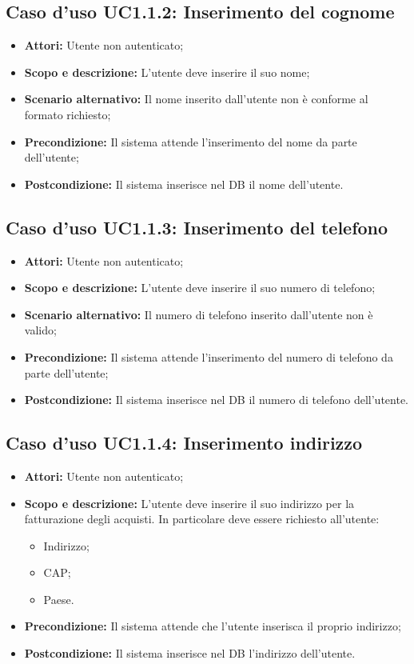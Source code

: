 \documentclass[12pt,a4paper,titlepage]{article}
\begin{document}
	\subsection{Caso d'uso UC1.1.2: Inserimento del cognome}
	\label{UC1.1.2}
	\begin{itemize}
		\item \textbf{Attori:} Utente non autenticato;
		\item \textbf{Scopo e descrizione:} L'utente deve inserire il suo nome;
		\item \textbf{Scenario alternativo:} Il nome inserito dall'utente non è conforme al formato richiesto;
		\item \textbf{Precondizione:} Il sistema attende l'inserimento del nome da parte dell'utente;
		\item \textbf{Postcondizione:} Il sistema inserisce nel DB il nome dell'utente.
	\end{itemize}
	\subsection{Caso d'uso UC1.1.3: Inserimento del telefono}
	\label{UC1.1.3}
	\begin{itemize}
		\item \textbf{Attori:} Utente non autenticato;
		\item \textbf{Scopo e descrizione:} L'utente deve inserire il suo numero di telefono;
		\item \textbf{Scenario alternativo:} Il numero di telefono inserito dall'utente non è valido;
		\item \textbf{Precondizione:} Il sistema attende l'inserimento del numero di telefono da parte dell'utente;
		\item \textbf{Postcondizione:} Il sistema inserisce nel DB il numero di telefono dell'utente.
	\end{itemize}
	\subsection{Caso d'uso UC1.1.4: Inserimento indirizzo}
	\label{UC1.1.4}
	\begin{itemize}
		\item \textbf{Attori:} Utente non autenticato;
		\item \textbf{Scopo e descrizione:} L'utente deve inserire il suo indirizzo per la fatturazione degli acquisti. In particolare deve essere richiesto all'utente:
		\begin{itemize}
			\item Indirizzo;
			\item CAP;
			\item Paese.
		\end{itemize}
		\item \textbf{Precondizione:} Il sistema attende che l'utente inserisca il proprio indirizzo;
		\item \textbf{Postcondizione: }Il sistema inserisce nel DB l'indirizzo dell'utente.
	\end{itemize}
\end{document}
